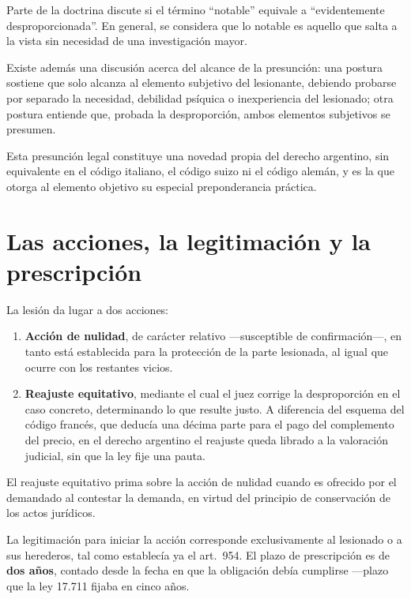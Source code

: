 \documentclass[12pt,oneside]{book}
\begin{document}
Parte de la doctrina discute si el término ``notable'' equivale a ``evidentemente desproporcionada''. En general, se considera que lo notable es aquello que salta a la vista sin necesidad de una investigación mayor.

Existe además una discusión acerca del alcance de la presunción: una postura sostiene que solo alcanza al elemento subjetivo del lesionante, debiendo probarse por separado la necesidad, debilidad psíquica o inexperiencia del lesionado; otra postura entiende que, probada la desproporción, ambos elementos subjetivos se presumen.

\begin{note}
Esta presunción legal constituye una novedad propia del derecho argentino, sin equivalente en el código italiano, el código suizo ni el código alemán, y es la que otorga al elemento objetivo su especial preponderancia práctica.
\end{note}

\section{Las acciones, la legitimación y la prescripción}

La lesión da lugar a dos acciones:

\begin{enumerate}
    \item \textbf{Acción de nulidad}, de carácter relativo —susceptible de confirmación—, en tanto está establecida para la protección de la parte lesionada, al igual que ocurre con los restantes vicios.
    \item \textbf{Reajuste equitativo}, mediante el cual el juez corrige la desproporción en el caso concreto, determinando lo que resulte justo. A diferencia del esquema del código francés, que deducía una décima parte para el pago del complemento del precio, en el derecho argentino el reajuste queda librado a la valoración judicial, sin que la ley fije una pauta.
\end{enumerate}

\begin{important}
El reajuste equitativo prima sobre la acción de nulidad cuando es ofrecido por el demandado al contestar la demanda, en virtud del principio de conservación de los actos jurídicos.
\end{important}

La legitimación para iniciar la acción corresponde exclusivamente al lesionado o a sus herederos, tal como establecía ya el art.\ 954. El plazo de prescripción es de \textbf{dos años}, contado desde la fecha en que la obligación debía cumplirse —plazo que la ley 17.711 fijaba en cinco años.
\end{document}
